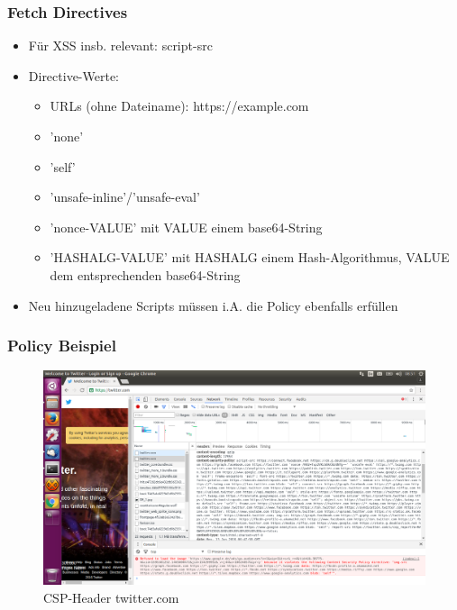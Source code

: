 \documentclass[handout]{beamer}
\begin{document}
\begin{frame}
\frametitle{Fetch Directives}
\begin{itemize}
\item Für XSS insb. relevant: script-src
\item Directive-Werte:
\begin{itemize}
\item URLs (ohne Dateiname): https://example.com
\item 'none'
\item 'self'
\item 'unsafe-inline'/'unsafe-eval'
\item 'nonce-VALUE' mit VALUE einem base64-String
\item 'HASHALG-VALUE' mit HASHALG einem Hash-Algorithmus, VALUE dem entsprechenden base64-String
\end{itemize}
\item Neu hinzugeladene Scripts müssen i.A. die Policy ebenfalls erfüllen
\end{itemize}
\end{frame}


\begin{frame}
\frametitle{Policy Beispiel}
\begin{figure}[ht]
	\centering
	\includegraphics[width=12cm]{twitter_csp.png}
	\caption{CSP-Header twitter.com}
\end{figure}
\end{frame}
\end{document}
